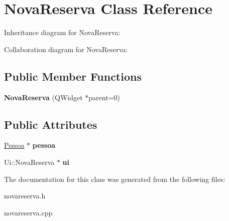 \hypertarget{classNovaReserva}{}\section{Nova\+Reserva Class Reference}
\label{classNovaReserva}


Inheritance diagram for Nova\+Reserva\+:


Collaboration diagram for Nova\+Reserva\+:
\subsection*{Public Member Functions}
\begin{DoxyCompactItemize}
\item 
{\bfseries Nova\+Reserva} (Q\+Widget $\ast$parent=0)\hypertarget{classNovaReserva_a07a970a507215f0f9b79a6a9d29977c9}{}\label{classNovaReserva_a07a970a507215f0f9b79a6a9d29977c9}

\end{DoxyCompactItemize}
\subsection*{Public Attributes}
\begin{DoxyCompactItemize}
\item 
\hyperlink{classPessoa}{Pessoa} $\ast$ {\bfseries pessoa}\hypertarget{classNovaReserva_ac6c4e1585cba017a8d99a772ea57f32d}{}\label{classNovaReserva_ac6c4e1585cba017a8d99a772ea57f32d}

\item 
Ui\+::\+Nova\+Reserva $\ast$ {\bfseries ui}\hypertarget{classNovaReserva_a9645891ef90615173af7c66b09f33cae}{}\label{classNovaReserva_a9645891ef90615173af7c66b09f33cae}

\end{DoxyCompactItemize}


The documentation for this class was generated from the following files\+:\begin{DoxyCompactItemize}
\item 
novareserva.\+h\item 
novareserva.\+cpp\end{DoxyCompactItemize}
